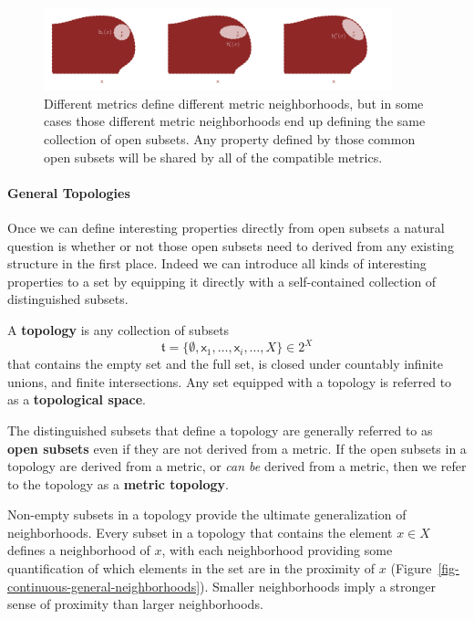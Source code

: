 \documentclass[
  letterpaper,
  DIV=11,
  numbers=noendperiod]{scrartcl}
\let\oldparagraph\paragraph
\renewcommand{\paragraph}[1]{\oldparagraph{#1}\mbox{}}
\begin{document}
\begin{figure}

{\centering \includegraphics[width=0.9\textwidth,height=\textheight]{figures/structures/metric_topology/equivalent_open_subsets/equivalent_open_subsets.pdf}

}

\caption{\label{fig-equivalent-open-subsets}Different metrics define
different metric neighborhoods, but in some cases those different metric
neighborhoods end up defining the same collection of open subsets. Any
property defined by those common open subsets will be shared by all of
the compatible metrics.}

\end{figure}

\hypertarget{sec:general-topology}{%
\paragraph{General Topologies}\label{sec:general-topology}}

Once we can define interesting properties directly from open subsets a
natural question is whether or not those open subsets need to derived
from any existing structure in the first place. Indeed we can introduce
all kinds of interesting properties to a set by equipping it directly
with a self-contained collection of distinguished subsets.

A \textbf{topology} is any collection of subsets \[
\mathfrak{t}
= \{ \emptyset, \mathsf{x}_{1}, \ldots, \mathsf{x}_{i}, \ldots, X \} \in 2^{X}
\] that contains the empty set and the full set, is closed under
countably infinite unions, and finite intersections. Any set equipped
with a topology is referred to as a \textbf{topological space}.

The distinguished subsets that define a topology are generally referred
to as \textbf{open subsets} even if they are not derived from a metric.
If the open subsets in a topology are derived from a metric, or
\emph{can be} derived from a metric, then we refer to the topology as a
\textbf{metric topology}.

Non-empty subsets in a topology provide the ultimate generalization of
neighborhoods. Every subset in a topology that contains the element
\(x \in X\) defines a neighborhood of \(x\), with each neighborhood
providing some quantification of which elements in the set are in the
proximity of \(x\) (Figure~\ref{fig-continuous-general-neighborhoods}).
Smaller neighborhoods imply a stronger sense of proximity than larger
neighborhoods.
\end{document}
